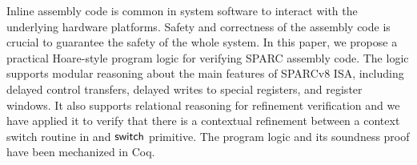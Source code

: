Inline assembly code is common in system software to interact with
the underlying hardware platforms. Safety and correctness of the
assembly code is crucial to guarantee the safety of the whole
system. In this paper, we propose a practical Hoare-style program
logic for verifying SPARC assembly code. The logic supports
modular reasoning about the main features of SPARCv8 ISA, including
delayed control transfers, delayed writes to special registers,
and register windows. 
It also supports relational reasoning for refinement 
verification and we have applied it to verify that 
there is a contextual refinement 
between a context switch routine in \sparc{} and 
$\mathsf{switch}{}$ primitive. The program logic and its soundness proof 
have been mechanized in Coq. 
